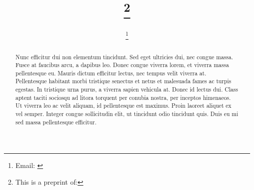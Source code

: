 \documentclass[11pt]{article}           %
\begin{document}
\title{\papertitle\footnote{This is a preprint of: \papercitation}}
\date{\paperdate}
\author[]{\myname \thanks{Email: \href{mailto:\myemail}{\myemail}}}
\affil[]{\myaffiliation}

\maketitle
	
\begin{abstract}

Nunc efficitur dui non elementum tincidunt. Sed eget ultricies dui, nec congue massa. Fusce at faucibus arcu, a dapibus leo. Donec congue viverra lorem, et viverra massa pellentesque eu. Mauris dictum efficitur lectus, nec tempus velit viverra at. Pellentesque habitant morbi tristique senectus et netus et malesuada fames ac turpis egestas. In tristique urna purus, a viverra sapien vehicula at. Donec id lectus dui. Class aptent taciti sociosqu ad litora torquent per conubia nostra, per inceptos himenaeos. Ut viverra leo ac velit aliquam, id pellentesque est maximus. Proin laoreet aliquet ex vel semper. Integer congue sollicitudin elit, ut tincidunt odio tincidunt quis. Duis eu mi sed massa pellentesque efficitur.

\end{abstract}

\vspace{0.5cm}
\end{document}
